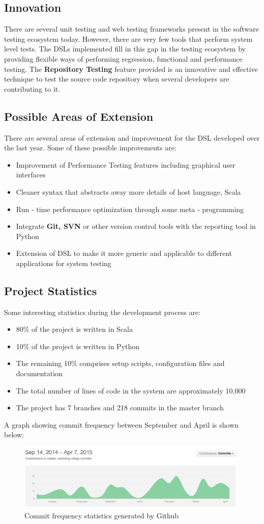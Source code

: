 \subsection{Innovation}
There are several unit testing and web testing frameworks present in the software testing ecosystem today. However, there are very few tools that perform system level tests. The DSLs implemented fill in this gap in the testing ecosystem by providing flexible ways of performing regression, functional and performance testing. The \textbf{Repository Testing} feature provided is an innovative and effective technique to test the source code repository when several developers are contributing to it.

\subsection{Possible Areas of Extension}
There are several areas of extension and improvement for the DSL developed over the last year. Some of these possible improvements are:
\begin{itemize}
\item Improvement of Performance Testing features including graphical user interfaces
\item Cleaner syntax that abstracts away more details of host language, Scala
\item Run - time performance optimization through some meta - programming
\item Integrate \textbf{Git, SVN} or other version control tools with the reporting tool in Python
\item Extension of DSL to make it more generic and applicable to different applications for system testing
\end{itemize}

\subsection{Project Statistics}

Some interesting statistics during the development process are:
\begin{itemize}
\item 80\% of the project is written in Scala
\item 10\% of the project is written in Python
\item The remaining 10\% comprises setup scripts, configuration files and documentation
\item The total number of lines of code in the system are approximately 10,000
\item The project has 7 branches and 218 commits in the master branch
\end{itemize}

A graph showing commit frequency between September and April is shown below:
\begin{figure}[H]
  \centering
    \includegraphics[height=120px]{figures/commit_frequency.png}
  \caption{Commit frequency statistics generated by Github}
\end{figure}
\newpage